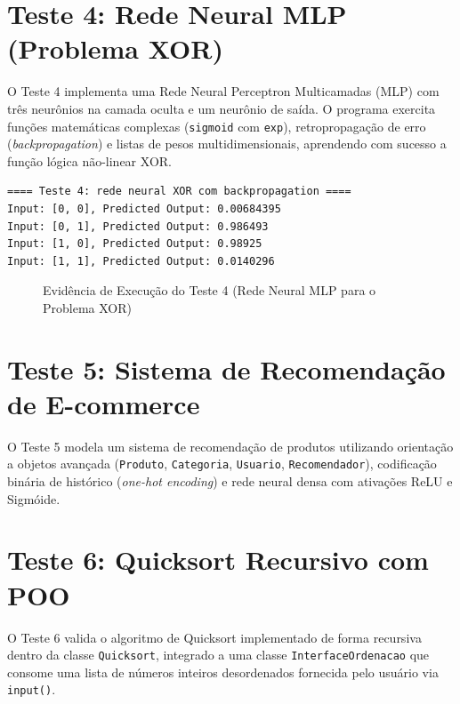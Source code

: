 \section{Teste 4: Rede Neural MLP (Problema XOR)}
O Teste 4 implementa uma Rede Neural Perceptron Multicamadas (MLP) com três neurônios na camada oculta e um neurônio de saída. O programa exercita funções matemáticas complexas (\texttt{sigmoid} com \texttt{exp}), retropropagação de erro (\textit{backpropagation}) e listas de pesos multidimensionais, aprendendo com sucesso a função lógica não-linear XOR.

\begin{lstlisting}[language=bash, caption={Saida da Rede Neural MLP para a porta XOR (Teste 4)}]
==== Teste 4: rede neural XOR com backpropagation ====
Input: [0, 0], Predicted Output: 0.00684395
Input: [0, 1], Predicted Output: 0.986493
Input: [1, 0], Predicted Output: 0.98925
Input: [1, 1], Predicted Output: 0.0140296
\end{lstlisting}

\begin{figure}[htbp]
    \centering
    \caption{Evidência de Execução do Teste 4 (Rede Neural MLP para o Problema XOR)}
    \label{fig:teste4_print}
\end{figure}

\section{Teste 5: Sistema de Recomendação de E-commerce}
O Teste 5 modela um sistema de recomendação de produtos utilizando orientação a objetos avançada (\texttt{Produto}, \texttt{Categoria}, \texttt{Usuario}, \texttt{Recomendador}), codificação binária de histórico (\textit{one-hot encoding}) e rede neural densa com ativações ReLU e Sigmóide.

\section{Teste 6: Quicksort Recursivo com POO}
O Teste 6 valida o algoritmo de Quicksort implementado de forma recursiva dentro da classe \texttt{Quicksort}, integrado a uma classe \texttt{InterfaceOrdenacao} que consome uma lista de números inteiros desordenados fornecida pelo usuário via \texttt{input()}.

